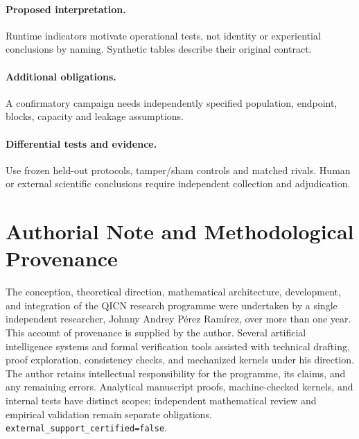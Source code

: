\documentclass[11pt,a4paper]{article}
\theoremstyle{definition}
\begin{document}
\paragraph{Proposed interpretation.} Runtime indicators motivate operational tests, not identity or experiential conclusions by naming. Synthetic tables describe their original contract.

\paragraph{Additional obligations.} A confirmatory campaign needs independently specified population, endpoint, blocks, capacity and leakage assumptions.

\paragraph{Differential tests and evidence.} Use frozen held-out protocols, tamper/sham controls and matched rivals. Human or external scientific conclusions require independent collection and adjudication.



\printbibliography

\section*{Authorial Note and Methodological Provenance}
The conception, theoretical direction, mathematical architecture, development,
and integration of the QICN research programme were undertaken by a single
independent researcher, Johnny Andrey P\'erez Ram\'irez, over more than one year.
This account of provenance is supplied by the author. Several artificial
intelligence systems and formal verification tools assisted with technical
drafting, proof exploration, consistency checks, and mechanized kernels under
his direction. The author retains intellectual responsibility for the
programme, its claims, and any remaining errors. Analytical manuscript proofs,
machine-checked kernels, and internal tests have distinct scopes; independent
mathematical review and empirical validation remain separate obligations.
\texttt{external\_support\_certified=false}.
\end{document}
